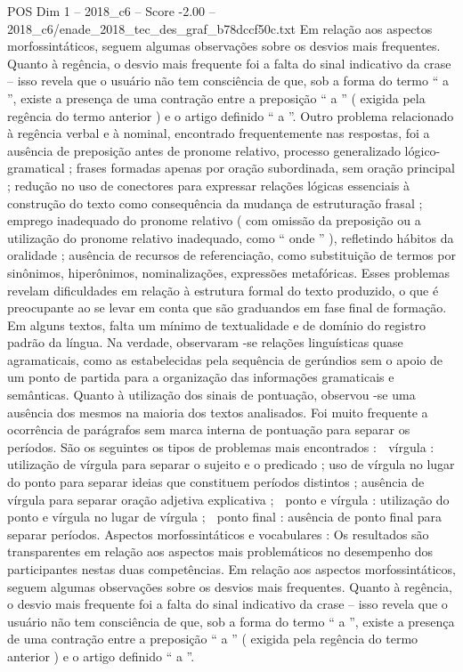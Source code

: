 \begin{textsample}{POS Dim 1 – 2018\_c6 – Score -2.00 – 2018\_c6/enade\_2018\_tec\_des\_graf\_b78dccf50c.txt}
Em relação aos aspectos morfossintáticos, seguem algumas observações sobre os desvios mais frequentes.
Quanto à regência, o desvio mais frequente foi a falta do sinal indicativo da crase – isso revela que o usuário não tem consciência de que, sob a forma do termo “ a ”, existe a presença de uma contração entre a preposição “ a ” ( exigida pela regência do termo anterior ) e o artigo definido “ a ”.
Outro problema relacionado à regência verbal e à nominal, encontrado frequentemente nas respostas, foi a ausência de preposição antes de pronome relativo, processo generalizado lógico-gramatical ; frases formadas apenas por oração subordinada, sem oração principal ; redução no uso de conectores para expressar relações lógicas essenciais à construção do texto como consequência da mudança de estruturação frasal ; emprego inadequado do pronome relativo ( com omissão da preposição ou a utilização do pronome relativo inadequado, como “ onde ” ), refletindo hábitos da oralidade ; ausência de recursos de referenciação, como substituição de termos por sinônimos, hiperônimos, nominalizações, expressões metafóricas.
Esses problemas revelam dificuldades em relação à estrutura formal do texto produzido, o que é preocupante ao se levar em conta que são graduandos em fase final de formação.
Em alguns textos, falta um mínimo de textualidade e de domínio do registro padrão da língua.
Na verdade, observaram -se relações linguísticas quase agramaticais, como as estabelecidas pela sequência de gerúndios sem o apoio de um ponto de partida para a organização das informações gramaticais e semânticas.
Quanto à utilização dos sinais de pontuação, observou -se uma ausência dos mesmos na maioria dos textos analisados.
Foi muito frequente a ocorrência de parágrafos sem marca interna de pontuação para separar os períodos.
São os seguintes os tipos de problemas mais encontrados :  vírgula : utilização de vírgula para separar o sujeito e o predicado ; uso de vírgula no lugar do ponto para separar ideias que constituem períodos distintos ; ausência de vírgula para separar oração adjetiva explicativa ;  ponto e vírgula : utilização do ponto e vírgula no lugar de vírgula ;  ponto final : ausência de ponto final para separar períodos.
Aspectos morfossintáticos e vocabulares : Os resultados são transparentes em relação aos aspectos mais problemáticos no desempenho dos participantes nestas duas competências.
Em relação aos aspectos morfossintáticos, seguem algumas observações sobre os desvios mais frequentes.
Quanto à regência, o desvio mais frequente foi a falta do sinal indicativo da crase – isso revela que o usuário não tem consciência de que, sob a forma do termo “ a ”, existe a presença de uma contração entre a preposição “ a ” ( exigida pela regência do termo anterior ) e o artigo definido “ a ”.

\end{textsample}
